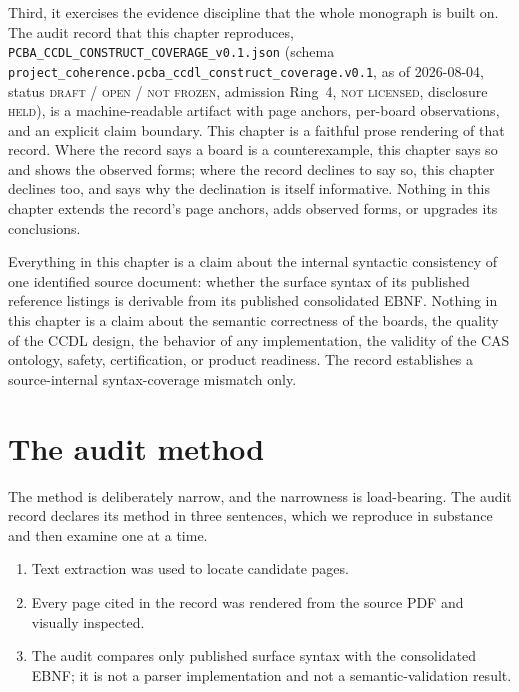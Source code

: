 Third, it exercises the evidence discipline that the whole monograph is built on. The audit record that this chapter reproduces, \texttt{PCBA\_CCDL\_CONSTRUCT\_COVERAGE\_v0.1.json} (schema \texttt{project\_coherence.pcba\_ccdl\_construct\_coverage.v0.1}, as of 2026-08-04, status \textsc{draft / open / not frozen}, admission Ring~4, \textsc{not licensed}, disclosure \textsc{held}), is a machine-readable artifact with page anchors, per-board observations, and an explicit claim boundary. This chapter is a faithful prose rendering of that record. Where the record says a board is a counterexample, this chapter says so and shows the observed forms; where the record declines to say so, this chapter declines too, and says why the declination is itself informative. Nothing in this chapter extends the record's page anchors, adds observed forms, or upgrades its conclusions.

\begin{boundary}\label{ch10:scope}
Everything in this chapter is a claim about the internal syntactic consistency of one identified source document: whether the surface syntax of its published reference listings is derivable from its published consolidated EBNF. Nothing in this chapter is a claim about the semantic correctness of the boards, the quality of the CCDL design, the behavior of any implementation, the validity of the CAS ontology, safety, certification, or product readiness. The record establishes a source-internal syntax-coverage mismatch only.
\end{boundary}

\section{The audit method}\label{ch10:method}

The method is deliberately narrow, and the narrowness is load-bearing. The audit record declares its method in three sentences, which we reproduce in substance and then examine one at a time.

\begin{enumerate}
\item Text extraction was used to locate candidate pages.
\item Every page cited in the record was rendered from the source PDF and visually inspected.
\item The audit compares only published surface syntax with the consolidated EBNF; it is not a parser implementation and not a semantic-validation result.
\end{enumerate}


